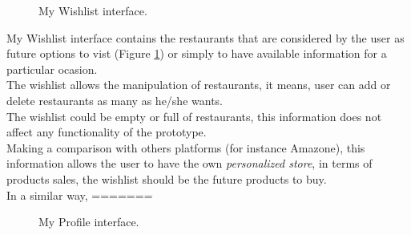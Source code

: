 \begin{figure}
\captionsetup{font=footnotesize}
\centering
{}
\caption{My Wishlist interface.}
\label{fig:mywishlist}   
\end{figure}
My Wishlist interface contains the restaurants that are  considered by
the user as future options to vist  (Figure  \ref{fig:mywishlist})  or
simply to have available information for a particular  ocasion. \\The
wishlist allows the manipulation of restaurants,  it means, user can
add or delete restaurants as many as  he/she wants. \\The wishlist could
be empty or full of  restaurants, this information does not affect any
functionality  of the prototype. \\
Making a comparison with others platforms (for instance 
Amazone), this information allows the user to have the own 
\textit{personalized store}, in terms of products sales, the wishlist 
should be the future products to buy.\\ In a similar way, 
=======
\begin{figure}
\captionsetup{font=footnotesize}
\centering
{}
\caption{My Profile interface.}
\label{fig:myprofile}   
\end{figure}
